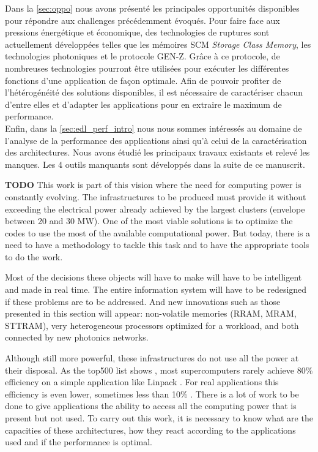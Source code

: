     
    Dans la \autoref{sec:oppo} nous avons présenté les principales opportunités disponibles pour répondre aux challenges précédemment évoqués. Pour faire face aux pressions énergétique et économique, des technologies de ruptures sont actuellement développées telles que les mémoires SCM \textit{Storage Class Memory}, les technologies photoniques et le protocole GEN-Z. Grâce à ce protocole, de nombreuses technologies pourront être utilisées pour exécuter les différentes fonctions d’une application de façon optimale. Afin de pouvoir profiter de l'hétérogénéité des solutions disponibles, il est nécessaire de caractériser chacun d'entre elles et d'adapter les applications pour en extraire le maximum de performance.\\
    
    Enfin, dans la \autoref{sec:edl_perf_intro} nous nous sommes intéressés au domaine de l'analyse de la performance des applications ainsi qu'à celui de la caractérisation des architectures. Nous avons étudié les principaux travaux existants et relevé les manques. Les 4 outils manquants sont développés dans la suite de ce manuscrit.

\iffalse

    
    \textbf{TODO}
    This work is part of this vision where the need for computing power is constantly evolving. The infrastructures to be produced must provide it without exceeding the electrical power already achieved by the largest clusters (envelope between 20 and 30 MW). One of the most viable solutions is to optimize the codes to use the most of the available computational power. But today, there is a need to have a methodology to tackle this task and to have the appropriate tools to do the work.
    
    Most of the decisions these objects will have to make will have to be intelligent and made in real time. The entire information system will have to be redesigned if these problems are to be addressed. And new innovations such as those presented in this section will appear: non-volatile memories (RRAM, MRAM, STTRAM), very heterogeneous processors optimized for a workload, and both connected by new photonics networks.
    
    
    Although still more powerful, these infrastructures do not use all the power at their disposal. As the top500 list shows \cite{Top500}, most supercomputers rarely achieve 80\% efficiency on a simple application like Linpack \cite{Dongarra2003}. For real applications this efficiency is even lower, sometimes less than 10\% \cite{Oliker2005}. There is a lot of work to be done to give applications the ability to access all the computing power that is present but not used. To carry out this work, it is necessary to know what are the capacities of these architectures, how they react according to the applications used and if the performance is optimal.
    
